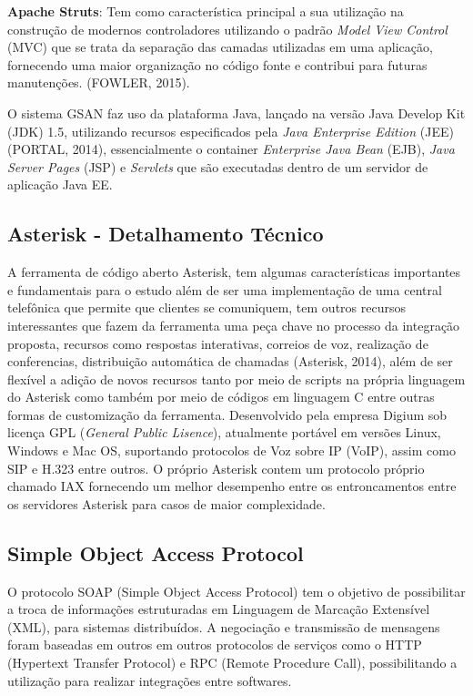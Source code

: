 \textbf{Apache Struts}: Tem como característica principal a sua utilização na construção de modernos controladores utilizando o padrão \textit{Model View Control} (MVC) que se trata da separação das camadas utilizadas em uma aplicação, fornecendo uma maior organização no código fonte e contribui para futuras manutenções. (FOWLER, 2015).

O sistema GSAN faz uso da plataforma Java, lançado na versão Java Develop Kit (JDK) 1.5, utilizando recursos especificados pela \textit{Java Enterprise Edition} (JEE) (PORTAL, 2014), essencialmente o container \textit{Enterprise Java Bean} (EJB), \textit{Java Server Pages }(JSP) e \textit{Servlets} que são executadas dentro de um servidor de aplicação Java EE.


\subsection{Asterisk - Detalhamento Técnico}
A ferramenta de código aberto Asterisk, tem algumas características importantes e fundamentais para o estudo além de ser uma implementação de uma central telefônica que permite que clientes se comuniquem, tem outros recursos interessantes que fazem da ferramenta uma peça chave no processo da integração proposta, recursos como respostas interativas, correios de voz, realização de conferencias, distribuição automática de chamadas (Asterisk, 2014), além de ser flexível a adição de novos recursos tanto por meio de scripts na própria linguagem do Asterisk como também por meio de códigos em linguagem C entre outras formas de customização da ferramenta. Desenvolvido pela empresa Digium sob licença GPL (\textit{General Public Lisence}), atualmente portável em versões Linux, Windows e Mac OS, suportando protocolos de Voz sobre IP (VoIP), assim como SIP e H.323 entre outros. O próprio Asterisk contem um protocolo próprio chamado IAX fornecendo um melhor desempenho entre os entroncamentos entre os servidores Asterisk para casos de maior complexidade.

\subsection{Simple Object Access Protocol}
O protocolo SOAP (Simple Object Access Protocol) tem o objetivo de possibilitar a troca de informações estruturadas em Linguagem de Marcação Extensível (XML), para sistemas distribuídos. A negociação e transmissão de mensagens foram baseadas em outros em outros protocolos de serviços como o HTTP (Hypertext Transfer Protocol) e RPC (Remote Procedure Call), possibilitando a utilização para realizar integrações entre softwares.

